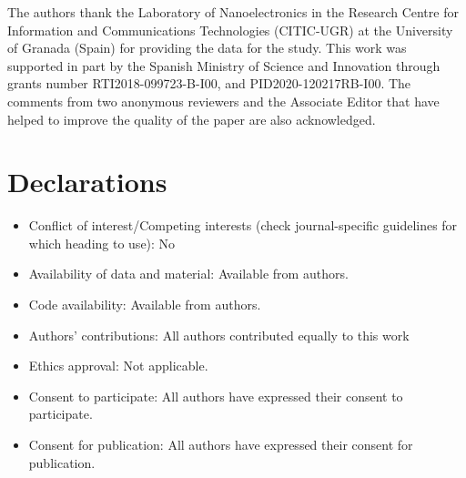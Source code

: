 \documentclass[sn-mathphys]{sn-jnl}%
\theoremstyle{thmstyleone}%
\theoremstyle{thmstyletwo}%
\theoremstyle{thmstylethree}%
\begin{document}
The authors thank the Laboratory of Nanoelectronics in the Research Centre for Information and Communications Technologies (CITIC-UGR) at the University of Granada (Spain) for providing the data for the study. This work was supported in part by the Spanish Ministry of Science and Innovation through grants number	RTI2018-099723-B-I00, and PID2020-120217RB-I00.
The comments from two anonymous reviewers and the Associate Editor that have helped to improve the quality of the paper are also acknowledged.

\section*{Declarations}
%

\begin{itemize}
\item Conflict of interest/Competing interests (check journal-specific guidelines for which heading to use): No
\item Availability of data and material: Available from authors.
\item Code availability: Available from authors.
\item Authors' contributions: All authors contributed equally to this work
\item Ethics approval: Not applicable.
\item Consent to participate: All authors have expressed their consent to participate.
\item Consent for publication: All authors have expressed their consent for publication.
%
\end{itemize}






\end{document}

